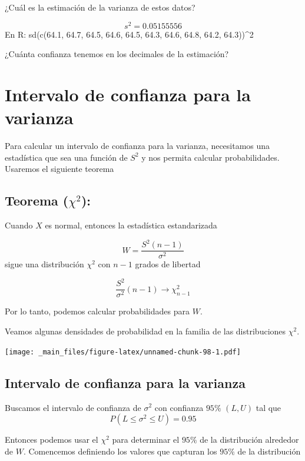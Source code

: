 \documentclass[
]{book}
\begin{document}
¿Cuál es la estimación de la varianza de estos datos?

\[s^2=0.05155556\]
En R: sd(c(64.1, 64.7, 64.5, 64.6, 64.5, 64.3, 64.6, 64.8, 64.2, 64.3))\^{}2

¿Cuánta confianza tenemos en los decimales de la estimación?

\hypertarget{intervalo-de-confianza-para-la-varianza}{%
\section{Intervalo de confianza para la varianza}\label{intervalo-de-confianza-para-la-varianza}}

Para calcular un intervalo de confianza para la varianza, necesitamos una estadística que sea una función de \(S^2\) y nos permita calcular probabilidades. Usaremos el siguiente teorema

\hypertarget{teorema-chi2}{%
\subsection{\texorpdfstring{Teorema (\(\chi^2\)):}{Teorema (\textbackslash chi\^{}2):}}\label{teorema-chi2}}

Cuando \(X\) es normal, entonces la estadística estandarizada

\[W=\frac{S^2(n-1)}{\sigma^2}\]
sigue una distribución \(\chi^2\) con \(n-1\) grados de libertad

\[\frac{S^2}{\sigma^2}(n-1)\rightarrow \chi^2_{n-1}\]

Por lo tanto, podemos calcular probabilidades para \(W\).

Veamos algunas densidades de probabilidad en la familia de las distribuciones \(\chi^2\).

\texttt{[image: \_main\_files/figure-latex/unnamed-chunk-98-1.pdf]}

\hypertarget{intervalo-de-confianza-para-la-varianza-1}{%
\subsection{Intervalo de confianza para la varianza}\label{intervalo-de-confianza-para-la-varianza-1}}

Buscamos el intervalo de confianza de \(\sigma^2\) con confianza \(95\%\) \((L,U)\) tal que \[P(L \leq \sigma^2 \leq U)=0.95\]

Entonces podemos usar el \(\chi^2\) para determinar el \(95\%\) de la distribución alrededor de \(W\). Comencemos definiendo los valores que capturan los \(95\%\) de la distribución
\end{document}
